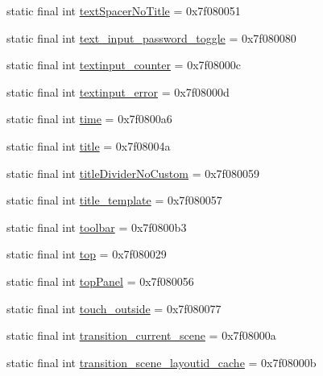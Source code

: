 \begin{CompactItemize}
\item 
static final int \hyperlink{classandroid_1_1support_1_1v7_1_1palette_1_1_r_1_1id_7ac6c5a39041f37d83dd7444b6073145}{textSpacerNoTitle} = 0x7f080051
\item 
static final int \hyperlink{classandroid_1_1support_1_1v7_1_1palette_1_1_r_1_1id_30b4434078f0808197c53cadd1f8ed8a}{text\_\-input\_\-password\_\-toggle} = 0x7f080080
\item 
static final int \hyperlink{classandroid_1_1support_1_1v7_1_1palette_1_1_r_1_1id_903418e94498a49c86871ac70194d868}{textinput\_\-counter} = 0x7f08000c
\item 
static final int \hyperlink{classandroid_1_1support_1_1v7_1_1palette_1_1_r_1_1id_23a27c57d0391b51ae60155c1305affc}{textinput\_\-error} = 0x7f08000d
\item 
static final int \hyperlink{classandroid_1_1support_1_1v7_1_1palette_1_1_r_1_1id_2303038286d3d069190d1c8615dd9378}{time} = 0x7f0800a6
\item 
static final int \hyperlink{classandroid_1_1support_1_1v7_1_1palette_1_1_r_1_1id_6fa97318920cf33a22d5953b202ab7a7}{title} = 0x7f08004a
\item 
static final int \hyperlink{classandroid_1_1support_1_1v7_1_1palette_1_1_r_1_1id_dbf1dbab190439ec044d991c2501334f}{titleDividerNoCustom} = 0x7f080059
\item 
static final int \hyperlink{classandroid_1_1support_1_1v7_1_1palette_1_1_r_1_1id_c4f5ce9052ce0f9ed7d9ae4b570122c4}{title\_\-template} = 0x7f080057
\item 
static final int \hyperlink{classandroid_1_1support_1_1v7_1_1palette_1_1_r_1_1id_6d61d2188ef854e0a44e56286b867eb2}{toolbar} = 0x7f0800b3
\item 
static final int \hyperlink{classandroid_1_1support_1_1v7_1_1palette_1_1_r_1_1id_bfdb040bee85caed7b73d0920e1ab655}{top} = 0x7f080029
\item 
static final int \hyperlink{classandroid_1_1support_1_1v7_1_1palette_1_1_r_1_1id_ed135b4a38a1395e2836711a57e4476b}{topPanel} = 0x7f080056
\item 
static final int \hyperlink{classandroid_1_1support_1_1v7_1_1palette_1_1_r_1_1id_c12a793eb447d1c0e63110cf2d2ab421}{touch\_\-outside} = 0x7f080077
\item 
static final int \hyperlink{classandroid_1_1support_1_1v7_1_1palette_1_1_r_1_1id_0ac2ddd731e34231b793329d2de8d81a}{transition\_\-current\_\-scene} = 0x7f08000a
\item 
static final int \hyperlink{classandroid_1_1support_1_1v7_1_1palette_1_1_r_1_1id_3fc83170b5526b5aa490145ad3e746e8}{transition\_\-scene\_\-layoutid\_\-cache} = 0x7f08000b

\end{CompactItemize}
